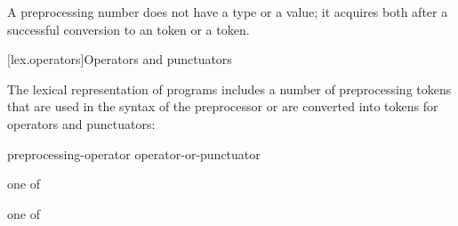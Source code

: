 \pnum
A preprocessing number does not have a type or a value; it acquires both
after a successful conversion to
an  token or
a  token.%

[lex.operators]{Operators and punctuators}

\pnum
{}%
%
The lexical representation of \Cpp{} programs includes a number of
preprocessing tokens that are used in the syntax of the preprocessor or
are converted into tokens for operators and punctuators:

\begin{bnf}
\br
    preprocessing-operator\br
    operator-or-punctuator
\end{bnf}

\begin{bnf}
 \textnormal{one of}\br
    \terminal{\# \ \ \ \ \ \ \ \#\# \ \ \ \ \ \ \%: \ \ \ \ \ \ \%:\%:}
\end{bnf}

\begin{bnf}
 \textnormal{one of}\br
    \terminal{\{ \ \ \ \ \ \ \ \} \ \ \ \ \ \ \ [ \ \ \ \ \ \ \ ] \ \ \ \ \ \ \ ( \ \ \ \ \ \ \ ) \ \ \ \ \ \ \ [: \ \ \ \ \ \ :]}\br
    \br
    \br
    \terminal{! \ \ \ \ \ \ \ + \ \ \ \ \ \ \ - \ \ \ \ \ \ \ * \ \ \ \ \ \ \ / \ \ \ \ \ \ \ \% \ \ \ \ \ \ \ \caret{} \ \ \ \ \ \ \ \& \ \ \ \ \ \ \ |}\br
    \terminal{= \ \ \ \ \ \ \ += \ \ \ \ \ \ -= \ \ \ \ \ \ *= \ \ \ \ \ \ /= \ \ \ \ \ \ \%= \ \ \ \ \ \ \caret{}= \ \ \ \ \ \ \&= \ \ \ \ \ \ |=}\br
    \terminal{== \ \ \ \ \ \ != \ \ \ \ \ \ < \ \ \ \ \ \ \ > \ \ \ \ \ \ \ <= \ \ \ \ \ \ >= \ \ \ \ \ \ <=> \ \ \ \ \ \&\& \ \ \ \ \ \ ||}\br
    \terminal{<< \ \ \ \ \ \ >> \ \ \ \ \ \ <<= \ \ \ \ \ >>= \ \ \ \ \ ++ \ \ \ \ \ \ -- \ \ \ \ \ \ ,}\br
    \br
\end{bnf}


